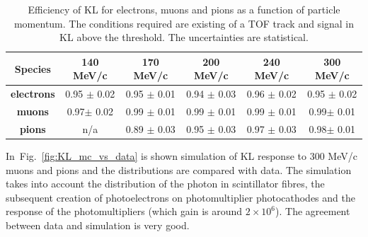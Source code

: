   \begin{table}[htb]
  	\begin{center}
  		\begin{tabular}{c|c|c|c|c|c} 
  			\hline
  			\textbf{Species} &\textbf{140 MeV/c} & \textbf{170 MeV/c} & \textbf{200 MeV/c}	&\textbf{240 MeV/c} &\textbf{300 MeV/c}\\
  			\hline
  			\textbf{electrons} & 0.95 $\pm$ 0.02  & 0.95 $\pm$ 0.01 & 0.94 $\pm$ 0.03 &  0.96 $\pm$ 0.02 &  0.95 $\pm$ 0.02 \\
  			\hline
  			\textbf{muons} &  0.97$\pm$ 0.02 & 0.99 $\pm$ 0.01  & 0.99 $\pm$  0.01 & 0.99 $\pm$ 0.01 & 0.99$\pm$ 0.01\\
  			\hline
  			\textbf{pions} &  n/a  & 0.89 $\pm$ 0.03  & 0.95 $\pm$ 0.03 & 0.97 $\pm$ 0.03 & 0.98$\pm$ 0.01\\
  			\hline
  		\end{tabular}
  		\caption{Efficiency of KL for electrons, muons and pions as a function of particle momentum. The conditions required are existing of a TOF track and signal in KL above the threshold. The uncertainties are statistical.}
  		\label{tab:KL_eff}
  	\end{center}
  \end{table}

In~Fig.~\ref{fig:KL_mc_vs_data} is shown simulation of KL response to 300 MeV/c muons and pions and the distributions are compared with data.
The simulation takes into account the distribution of the photon in scintillator fibres, the subsequent creation of photoelectrons on photomultiplier photocathodes and the response of the photomultipliers (which gain is around $2 \times 10^6$).
The agreement between data and simulation is very good.


